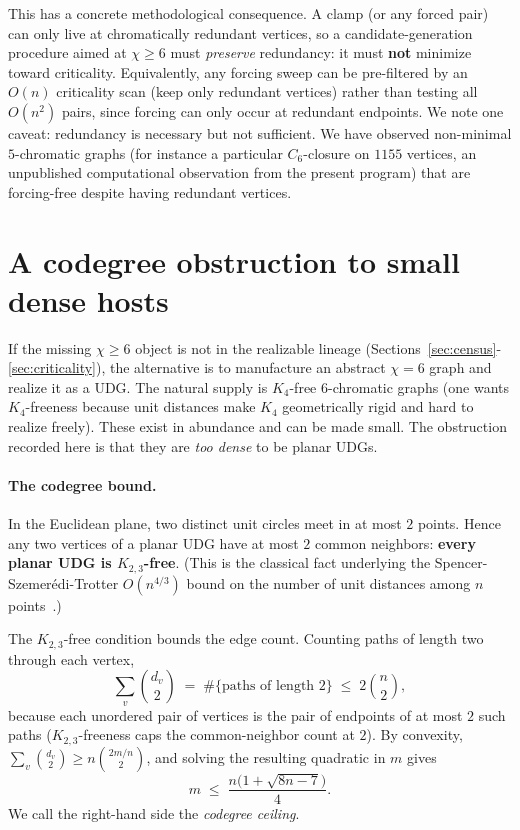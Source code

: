 \documentclass[11pt]{article}
\theoremstyle{definition}
\newcommand{\chrom}{\chi}
\begin{document}
This has a concrete methodological consequence. A clamp (or any forced pair) can
only live at chromatically redundant vertices, so a candidate-generation
procedure aimed at $\chrom \ge 6$ must \emph{preserve} redundancy: it must
\textbf{not} minimize toward criticality. Equivalently, any forcing sweep can be
pre-filtered by an $O(n)$ criticality scan (keep only redundant vertices) rather
than testing all $O(n^2)$ pairs, since forcing can only occur at redundant
endpoints. We note one caveat: redundancy is necessary
but not sufficient. We have observed non-minimal $5$-chromatic graphs (for
instance a particular $C_6$-closure on $1155$ vertices, an unpublished
computational observation from the present program) that are forcing-free despite
having redundant vertices.

\section{A codegree obstruction to small dense hosts}
\label{sec:codegree}

If the missing $\chrom \ge 6$ object is not in the realizable lineage
(Sections~\ref{sec:census}-\ref{sec:criticality}), the alternative is to
manufacture an abstract $\chrom = 6$ graph and realize it as a UDG. The natural
supply is $K_4$-free $6$-chromatic graphs (one wants $K_4$-freeness because unit
distances make $K_4$ geometrically rigid and hard to realize freely). These exist
in abundance and can be made small. The obstruction recorded here is that they
are \emph{too dense} to be planar UDGs.

\paragraph{The codegree bound.} In the Euclidean plane, two distinct unit circles
meet in at most $2$ points. Hence any two vertices of a planar UDG have at most
$2$ common neighbors: \textbf{every planar UDG is $K_{2,3}$-free}. (This is the
classical fact underlying the Spencer-Szemer\'edi-Trotter $O(n^{4/3})$ bound on
the number of unit distances among $n$ points~\cite{SpencerSzemerediTrotter1984}.)

The $K_{2,3}$-free condition bounds the edge count. Counting paths of length two
through each vertex,
\[
  \sum_{v} \binom{d_v}{2} \;=\; \#\{\text{paths of length } 2\}
  \;\le\; 2\binom{n}{2},
\]
because each unordered pair of vertices is the pair of endpoints of at most $2$
such paths ($K_{2,3}$-freeness caps the common-neighbor count at $2$). By
convexity, $\sum_v \binom{d_v}{2} \ge n \binom{2m/n}{2}$, and solving the
resulting quadratic in $m$ gives
\begin{equation}
  m \;\le\; \frac{n\bigl(1 + \sqrt{8n - 7}\bigr)}{4}.
  \label{eq:codeg-ceiling}
\end{equation}
We call the right-hand side the \emph{codegree ceiling}.
\end{document}
